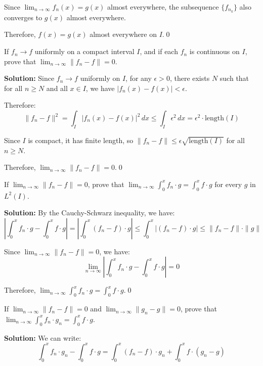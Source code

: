 Since $\lim_{n \to \infty} f_n(x) = g(x)$ almost everywhere, the subsequence $\{f_{n_k}\}$ also converges to $g(x)$ almost everywhere.

Therefore, $f(x) = g(x)$ almost everywhere on $I$.\qed


\begin{problembox}
If $f_n \to f$ uniformly on a compact interval $I$, and if each $f_n$ is continuous on $I$, prove that $\lim_{n \to \infty} \| f_n - f \| = 0$.
\end{problembox}

\bigskip\noindent\textbf{Solution:}
Since $f_n \to f$ uniformly on $I$, for any $\epsilon > 0$, there exists $N$ such that for all $n \geq N$ and all $x \in I$, we have $|f_n(x) - f(x)| < \epsilon$.

Therefore:
\[\| f_n - f \|^2 = \int_I |f_n(x) - f(x)|^2 \, dx \leq \int_I \epsilon^2 \, dx = \epsilon^2 \cdot \text{length}(I)\]

Since $I$ is compact, it has finite length, so $\| f_n - f \| \leq \epsilon \sqrt{\text{length}(I)}$ for all $n \geq N$.

Therefore, $\lim_{n \to \infty} \| f_n - f \| = 0$.\qed


\begin{problembox}
If $\lim_{n \to \infty} \| f_n - f \| = 0$, prove that $\lim_{n \to \infty} \int_0^x f_n \cdot g = \int_0^x f \cdot g$ for every $g$ in $L^2(I)$.
\end{problembox}

\bigskip\noindent\textbf{Solution:}
By the Cauchy-Schwarz inequality, we have:
\[\left|\int_0^x f_n \cdot g - \int_0^x f \cdot g\right| = \left|\int_0^x (f_n - f) \cdot g\right| \leq \int_0^x |(f_n - f) \cdot g| \leq \| f_n - f \| \cdot \| g \|\]

Since $\lim_{n \to \infty} \| f_n - f \| = 0$, we have:
\[\lim_{n \to \infty} \left|\int_0^x f_n \cdot g - \int_0^x f \cdot g\right| = 0\]

Therefore, $\lim_{n \to \infty} \int_0^x f_n \cdot g = \int_0^x f \cdot g$.\qed


\begin{problembox}
If $\lim_{n \to \infty} \| f_n - f \| = 0$ and $\lim_{n \to \infty} \| g_n - g \| = 0$, prove that $\lim_{n \to \infty} \int_0^x f_n \cdot g_n = \int_0^x f \cdot g$.
\end{problembox}

\bigskip\noindent\textbf{Solution:}
We can write:
\[\int_0^x f_n \cdot g_n - \int_0^x f \cdot g = \int_0^x (f_n - f) \cdot g_n + \int_0^x f \cdot (g_n - g)\]

